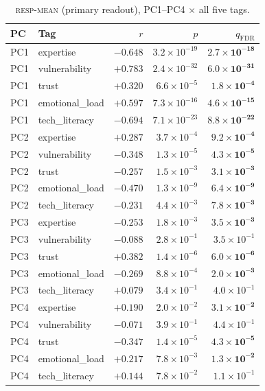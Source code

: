 \documentclass{article}
\newcommand{\respmean}{\textsc{resp-mean}}
\begin{document}
\begin{table}[h]
\centering\small
\caption{\respmean{} (primary readout), PC1--PC4 $\times$ all five tags.}
\label{tab:interp-resp}
\begin{tabular}{llrrr}
\toprule
PC & Tag & $r$ & $p$ & $q_{\text{FDR}}$ \\
\midrule
PC1 & expertise      & $-0.648$ & $3.2\times10^{-19}$ & $\mathbf{2.7\times10^{-18}}$ \\
PC1 & vulnerability  & $+0.783$ & $2.4\times10^{-32}$ & $\mathbf{6.0\times10^{-31}}$ \\
PC1 & trust          & $+0.320$ & $6.6\times10^{-5}$  & $\mathbf{1.8\times10^{-4}}$ \\
PC1 & emotional\_load& $+0.597$ & $7.3\times10^{-16}$ & $\mathbf{4.6\times10^{-15}}$ \\
PC1 & tech\_literacy & $-0.694$ & $7.1\times10^{-23}$ & $\mathbf{8.8\times10^{-22}}$ \\
\midrule
PC2 & expertise      & $+0.287$ & $3.7\times10^{-4}$  & $\mathbf{9.2\times10^{-4}}$ \\
PC2 & vulnerability  & $-0.348$ & $1.3\times10^{-5}$  & $\mathbf{4.3\times10^{-5}}$ \\
PC2 & trust          & $-0.257$ & $1.5\times10^{-3}$  & $\mathbf{3.1\times10^{-3}}$ \\
PC2 & emotional\_load& $-0.470$ & $1.3\times10^{-9}$  & $\mathbf{6.4\times10^{-9}}$ \\
PC2 & tech\_literacy & $-0.231$ & $4.4\times10^{-3}$  & $\mathbf{7.8\times10^{-3}}$ \\
\midrule
PC3 & expertise      & $-0.253$ & $1.8\times10^{-3}$  & $\mathbf{3.5\times10^{-3}}$ \\
PC3 & vulnerability  & $-0.088$ & $2.8\times10^{-1}$  & $3.5\times10^{-1}$ \\
PC3 & trust          & $+0.382$ & $1.4\times10^{-6}$  & $\mathbf{6.0\times10^{-6}}$ \\
PC3 & emotional\_load& $-0.269$ & $8.8\times10^{-4}$  & $\mathbf{2.0\times10^{-3}}$ \\
PC3 & tech\_literacy & $+0.079$ & $3.4\times10^{-1}$  & $4.0\times10^{-1}$ \\
\midrule
PC4 & expertise      & $+0.190$ & $2.0\times10^{-2}$  & $\mathbf{3.1\times10^{-2}}$ \\
PC4 & vulnerability  & $-0.071$ & $3.9\times10^{-1}$  & $4.4\times10^{-1}$ \\
PC4 & trust          & $-0.347$ & $1.4\times10^{-5}$  & $\mathbf{4.3\times10^{-5}}$ \\
PC4 & emotional\_load& $+0.217$ & $7.8\times10^{-3}$  & $\mathbf{1.3\times10^{-2}}$ \\
PC4 & tech\_literacy & $+0.144$ & $7.8\times10^{-2}$  & $1.1\times10^{-1}$ \\
\bottomrule
\end{tabular}
\end{table}
\end{document}
